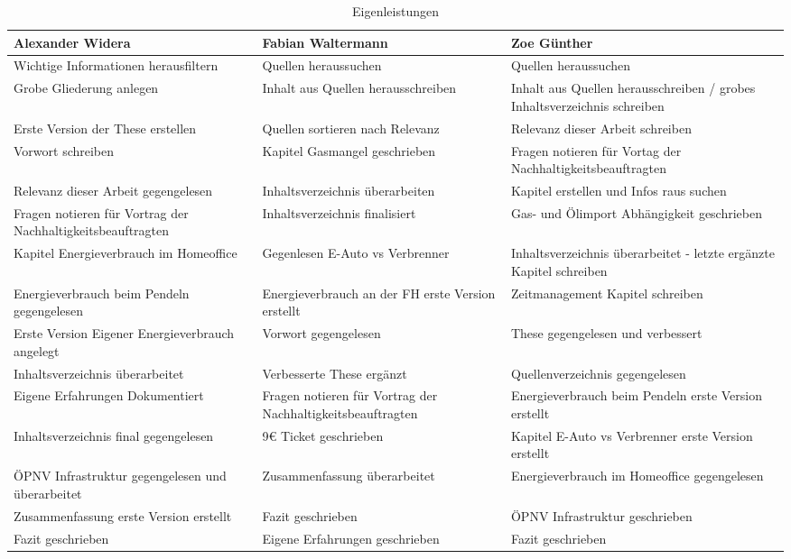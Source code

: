 \documentclass[a4paper,12pt]{scrartcl}
\begin{document}
\begin{table}
\centering
\begin{tabular}[!htb]{p{4cm}|p{4cm}|p{4cm}}
Alexander Widera & Fabian Waltermann & Zoe Günther \\
\hline
Wichtige Informationen herausfiltern & Quellen heraussuchen & Quellen heraussuchen \\
Grobe Gliederung anlegen & Inhalt aus Quellen herausschreiben & Inhalt aus Quellen herausschreiben / grobes Inhaltsverzeichnis schreiben \\
Erste Version der These erstellen & Quellen sortieren nach Relevanz & Relevanz dieser Arbeit schreiben \\
Vorwort schreiben & Kapitel Gasmangel geschrieben & Fragen notieren für Vortag der Nachhaltigkeitsbeauftragten \\
Relevanz dieser Arbeit gegengelesen & Inhaltsverzeichnis überarbeiten & Kapitel erstellen und Infos raus suchen \\
Fragen notieren für Vortrag der Nachhaltigkeitsbeauftragten & Inhaltsverzeichnis finalisiert & Gas- und Ölimport Abhängigkeit geschrieben \\
Kapitel Energieverbrauch im Homeoffice & Gegenlesen E-Auto vs Verbrenner & Inhaltsverzeichnis überarbeitet - letzte ergänzte Kapitel schreiben \\ 
Energieverbrauch beim Pendeln gegengelesen & Energieverbrauch an der FH erste Version erstellt & Zeitmanagement Kapitel schreiben \\
Erste Version Eigener Energieverbrauch angelegt & Vorwort gegengelesen & These gegengelesen und verbessert \\
Inhaltsverzeichnis überarbeitet & Verbesserte These ergänzt & Quellenverzeichnis gegengelesen \\
Eigene Erfahrungen Dokumentiert & Fragen notieren für Vortrag der Nachhaltigkeitsbeauftragten & Energieverbrauch beim Pendeln erste Version erstellt \\
Inhaltsverzeichnis final gegengelesen & 9€ Ticket geschrieben & Kapitel E-Auto vs Verbrenner erste Version erstellt \\
ÖPNV Infrastruktur gegengelesen und überarbeitet & Zusammenfassung überarbeitet & Energieverbrauch im Homeoffice gegengelesen \\
Zusammenfassung erste Version erstellt & Fazit geschrieben & ÖPNV Infrastruktur geschrieben \\
Fazit geschrieben & Eigene Erfahrungen geschrieben & Fazit geschrieben \\

\end{tabular}
\caption{Eigenleistungen}
\end{table}
\end{document}
